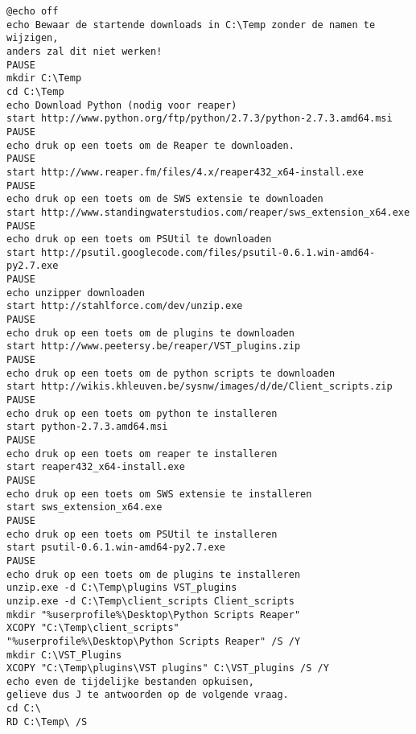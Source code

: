 \documentclass[DIV=calc]{scrartcl}
\begin{document}
\begin{lstlisting}[caption={reaper64.bat}, label=Windows installatiescript 64bit]
@echo off
echo Bewaar de startende downloads in C:\Temp zonder de namen te wijzigen, 
anders zal dit niet werken!
PAUSE
mkdir C:\Temp
cd C:\Temp
echo Download Python (nodig voor reaper)
start http://www.python.org/ftp/python/2.7.3/python-2.7.3.amd64.msi
PAUSE
echo druk op een toets om de Reaper te downloaden.
PAUSE
start http://www.reaper.fm/files/4.x/reaper432_x64-install.exe
PAUSE
echo druk op een toets om de SWS extensie te downloaden
start http://www.standingwaterstudios.com/reaper/sws_extension_x64.exe
PAUSE
echo druk op een toets om PSUtil te downloaden
start http://psutil.googlecode.com/files/psutil-0.6.1.win-amd64-py2.7.exe
PAUSE
echo unzipper downloaden
start http://stahlforce.com/dev/unzip.exe
PAUSE
echo druk op een toets om de plugins te downloaden
start http://www.peetersy.be/reaper/VST_plugins.zip
PAUSE
echo druk op een toets om de python scripts te downloaden
start http://wikis.khleuven.be/sysnw/images/d/de/Client_scripts.zip
PAUSE
echo druk op een toets om python te installeren
start python-2.7.3.amd64.msi
PAUSE
echo druk op een toets om reaper te installeren
start reaper432_x64-install.exe
PAUSE
echo druk op een toets om SWS extensie te installeren
start sws_extension_x64.exe
PAUSE
echo druk op een toets om PSUtil te installeren
start psutil-0.6.1.win-amd64-py2.7.exe
PAUSE
echo druk op een toets om de plugins te installeren
unzip.exe -d C:\Temp\plugins VST_plugins
unzip.exe -d C:\Temp\client_scripts Client_scripts
mkdir "%userprofile%\Desktop\Python Scripts Reaper"
XCOPY "C:\Temp\client_scripts" 
"%userprofile%\Desktop\Python Scripts Reaper" /S /Y
mkdir C:\VST_Plugins
XCOPY "C:\Temp\plugins\VST plugins" C:\VST_plugins /S /Y
echo even de tijdelijke bestanden opkuisen, 
gelieve dus J te antwoorden op de volgende vraag.
cd C:\
RD C:\Temp\ /S
\end{lstlisting}
\end{document}
